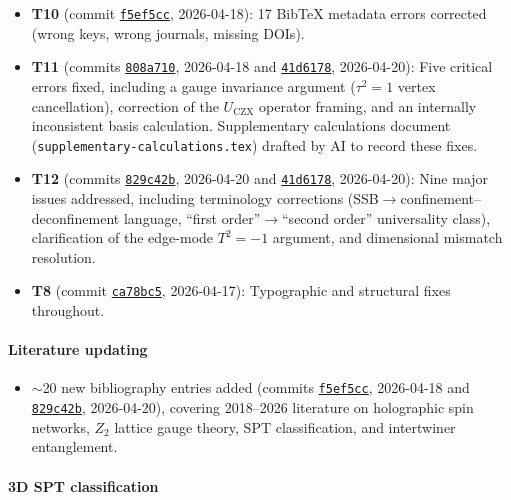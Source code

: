 \documentclass[preprint]{SciPost}
\theoremstyle{plain} %
\begin{document}
\begin{itemize}
\item \textbf{T10} (commit \href{https://github.com/space-cadet/timesarrow/commit/f5ef5cc}{\texttt{f5ef5cc}}, 2026-04-18): 17 BibTeX metadata errors corrected (wrong keys, wrong journals, missing DOIs).
\item \textbf{T11} (commits \href{https://github.com/space-cadet/timesarrow/commit/808a710}{\texttt{808a710}}, 2026-04-18 and \href{https://github.com/space-cadet/timesarrow/commit/41d6178}{\texttt{41d6178}}, 2026-04-20): Five critical errors fixed, including a gauge invariance argument ($\tau^2=1$ vertex cancellation), correction of the $U_{\mathrm{CZX}}$ operator framing, and an internally inconsistent basis calculation. Supplementary calculations document (\texttt{supplementary-calculations.tex}) drafted by AI to record these fixes.
\item \textbf{T12} (commits \href{https://github.com/space-cadet/timesarrow/commit/829c42b}{\texttt{829c42b}}, 2026-04-20 and \href{https://github.com/space-cadet/timesarrow/commit/41d6178}{\texttt{41d6178}}, 2026-04-20): Nine major issues addressed, including terminology corrections (SSB$\to$confinement--deconfinement language, ``first order''$\to$``second order'' universality class), clarification of the edge-mode $T^2=-1$ argument, and dimensional mismatch resolution.
\item \textbf{T8} (commit \href{https://github.com/space-cadet/timesarrow/commit/ca78bc5}{\texttt{ca78bc5}}, 2026-04-17): Typographic and structural fixes throughout.
\end{itemize}

\paragraph{Literature updating}

\begin{itemize}
\item $\sim$20 new bibliography entries added (commits \href{https://github.com/space-cadet/timesarrow/commit/f5ef5cc}{\texttt{f5ef5cc}}, 2026-04-18 and \href{https://github.com/space-cadet/timesarrow/commit/829c42b}{\texttt{829c42b}}, 2026-04-20), covering 2018--2026 literature on holographic spin networks, $Z_2$ lattice gauge theory, SPT classification, and intertwiner entanglement.
\end{itemize}

\paragraph{3D SPT classification}
\end{document}
